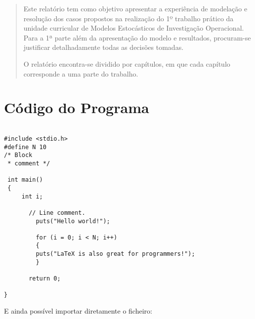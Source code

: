 \documentclass[pdftex,12pt,a4paper]{report}
\begin{document}

\begin{abstract}
Este relatório tem como objetivo apresentar a experiência de modelação
e resolução dos casos propostos na realização do 1º trabalho prático da unidade
curricular de Modelos Estocásticos de Investigação Operacional. Para a 1ª parte
além da apresentação do modelo e resultados, procuram-se justificar
detalhadamente todas as decisões tomadas. 

O relatório encontra-se dividido por capítulos, em que cada capítulo corresponde
a uma parte do trabalho.
\end{abstract}

\tableofcontents








\appendix

\chapter{Código do Programa}



\begin{verbatim}

#include <stdio.h>
#define N 10
/* Block
 * comment */

 int main()
 {
     int i;
	 
	   // Line comment.
		 puts("Hello world!");
			     
		 for (i = 0; i < N; i++)
		 {
		 puts("LaTeX is also great for programmers!");
		 }
										 
	   return 0;
				
}
\end{verbatim}


E ainda possível importar diretamente o ficheiro:










\end{document}
